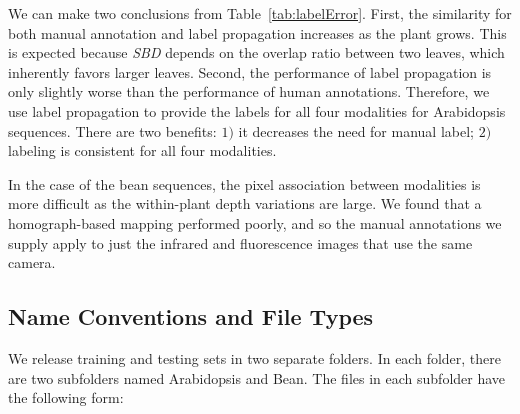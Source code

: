We can make two conclusions from Table~\ref{tab:labelError}.
First, the similarity for both manual annotation and label propagation increases as the plant grows.
This is expected because {\it{SBD}} depends on the overlap ratio between two leaves, which inherently favors larger leaves.
Second, the performance of label propagation is only slightly worse than the performance of human annotations.
Therefore, we use label propagation to provide the labels for all four modalities for Arabidopsis sequences.
There are two benefits: $1)$ it decreases the need for manual label; $2)$ labeling is consistent for all four modalities. 

In the case of the bean sequences, the pixel association between modalities is more difficult as the within-plant depth variations are large.
We found that a homograph-based mapping performed poorly, and so the manual annotations we supply apply to just the infrared and fluorescence images that use the same camera.


\subsection{Name Conventions and File Types}
We release training and testing sets in two separate folders.
In each folder, there are two subfolders named Arabidopsis and Bean.
The files in each subfolder have the following form:

